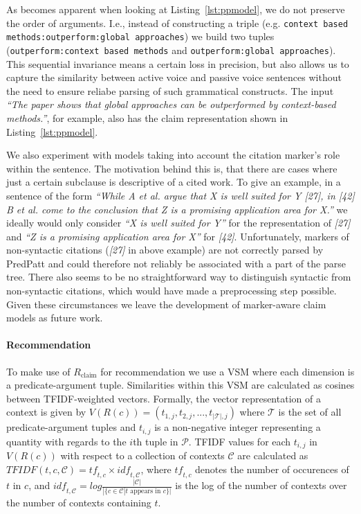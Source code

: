 As becomes apparent when looking at Listing~\ref{lst:ppmodel}, we do not preserve the order of arguments. I.e., instead of constructing a triple (e.g. \texttt{context based methods:outperform:global approaches}) we build two tuples (\texttt{outperform:context based methods} and \texttt{outper\-form:global approaches}). This sequential invariance means a certain loss in precision, but also allows us to capture the similarity between active voice and passive voice sentences without the need to ensure reliabe parsing of such grammatical constructs. The input \emph{``The paper shows that global approaches can be outperformed by context-based methods.''}, for example, also has the claim representation shown in Listing~\ref{lst:ppmodel}.

We also experiment with models taking into account the citation marker's role within the sentence. The motivation behind this is, that there are cases where just a certain subclause is descriptive of a cited work. To give an example, in a sentence of the form \emph{``While A et al. argue that X is well suited for Y [27], in [42] B et al. come to the conclusion that Z is a promising application area for X.''} we ideally would only consider \emph{``X is well suited for Y''} for the representation of \emph{[27]} and \emph{``Z is a promising application area for X''} for \emph{[42]}. Unfortunately, markers of non-syntactic citations (\emph{[27]} in above example) are not correctly parsed by PredPatt and could therefore not reliably be associated with a part of the parse tree. There also seems to be no straightforward way to distinguish syntactic from non-syntactic citations, which would have made a preprocessing step possible. Given these circumstances we leave the development of marker-aware claim models as future work.

\paragraph{Recommendation} To make use of $R_{\text{claim}}$ for recommendation we use a VSM where each dimension is a predicate-argument tuple. Similarities within this VSM are calculated as cosines between TFIDF-weighted vectors. Formally, the vector representation of a context is given by $V(R(c)) = (t_{1,j}, t_{2,j}, ..., t_{|\mathcal{T}|,j})$ where $\mathcal{T}$ is the set of all predicate-argument tuples %
and $t_{i,j}$ is a non-negative integer representing a quantity with regards to the $i$th tuple in $\mathcal{P}$. TFIDF values for each $t_{i,j}$ in $V(R(c))$ with respect to a collection of contexts $\mathcal{C}$ are calculated as $\mathit{TFIDF}(t, c, \mathcal{C}) = \mathit{tf}_{t,c} \times \mathit{idf}_{t,\mathcal{C}}$, where $\mathit{tf}_{t,c}$ denotes the number of occurences of $t$ in $c$, and $\mathit{idf}_{t,\mathcal{C}} = \mathit{log}\frac{|\mathcal{C}|}{|\{c\in\mathcal{C}|t\text{ appears in }c\}|}$ is the log of the number of contexts over the number of contexts containing $t$.

